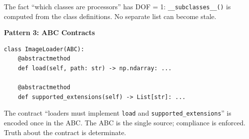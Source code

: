 The fact ``which classes are processors'' has DOF = 1: \texttt{\_\_subclasses\_\_()} is computed from the class definitions. No separate list can become stale.

\textbf{Pattern 3: ABC Contracts}

\begin{verbatim}
class ImageLoader(ABC):
    @abstractmethod
    def load(self, path: str) -> np.ndarray: ...

    @abstractmethod
    def supported_extensions(self) -> List[str]: ...
\end{verbatim}

The contract ``loaders must implement \texttt{load} and \texttt{supported\_extensions}'' is encoded once in the ABC. The ABC is the single source; compliance is enforced. Truth about the contract is determinate.


